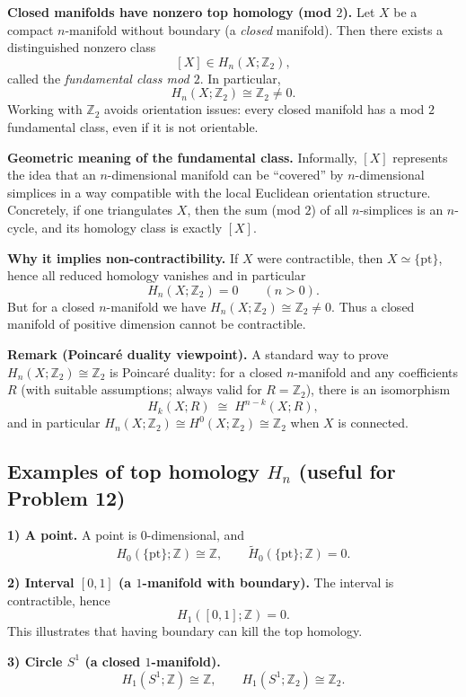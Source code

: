 \documentclass[12pt,a4paper]{article}
\theoremstyle{plain}
\theoremstyle{definition}      %
\begin{document}
\medskip
\noindent\textbf{Closed manifolds have nonzero top homology (mod $2$).}
Let $X$ be a compact $n$-manifold without boundary (a \emph{closed} manifold).
Then there exists a distinguished nonzero class
\[
[X]\in H_n(X;\mathbb{Z}_2),
\]
called the \emph{fundamental class mod $2$}. In particular,
\[
H_n(X;\mathbb{Z}_2)\cong \mathbb{Z}_2 \neq 0.
\]
Working with $\mathbb{Z}_2$ avoids orientation issues: every closed manifold has a mod $2$ fundamental class,
even if it is not orientable.

\medskip
\noindent\textbf{Geometric meaning of the fundamental class.}
Informally, $[X]$ represents the idea that an $n$-dimensional manifold can be ``covered'' by $n$-dimensional simplices
in a way compatible with the local Euclidean orientation structure.
Concretely, if one triangulates $X$, then the sum (mod $2$) of all $n$-simplices is an $n$-cycle,
and its homology class is exactly $[X]$.

\medskip
\noindent\textbf{Why it implies non-contractibility.}
If $X$ were contractible, then $X\simeq \{\mathrm{pt}\}$, hence all reduced homology vanishes and in particular
\[
H_n(X;\mathbb{Z}_2)=0 \qquad (n>0).
\]
But for a closed $n$-manifold we have $H_n(X;\mathbb{Z}_2)\cong\mathbb{Z}_2\neq 0$.
Thus a closed manifold of positive dimension cannot be contractible.

\medskip
\noindent\textbf{Remark (Poincar\'e duality viewpoint).}
A standard way to prove $H_n(X;\mathbb{Z}_2)\cong \mathbb{Z}_2$ is Poincar\'e duality:
for a closed $n$-manifold and any coefficients $R$ (with suitable assumptions; always valid for $R=\mathbb{Z}_2$),
there is an isomorphism
\[
H_k(X;R)\;\cong\; H^{n-k}(X;R),
\]
and in particular $H_n(X;\mathbb{Z}_2)\cong H^0(X;\mathbb{Z}_2)\cong \mathbb{Z}_2$
when $X$ is connected.

\subsection*{Examples of top homology $H_n$ (useful for Problem 12)}

\noindent\textbf{1) A point.}
A point is $0$-dimensional, and
\[
H_0(\{\mathrm{pt}\};\mathbb{Z})\cong \mathbb{Z},
\qquad
\widetilde H_0(\{\mathrm{pt}\};\mathbb{Z})=0.
\]

\medskip
\noindent\textbf{2) Interval $[0,1]$ (a $1$-manifold with boundary).}
The interval is contractible, hence
\[
H_1([0,1];\mathbb{Z})=0.
\]
This illustrates that having boundary can kill the top homology.

\medskip
\noindent\textbf{3) Circle $S^1$ (a closed $1$-manifold).}
\[
H_1(S^1;\mathbb{Z})\cong \mathbb{Z},
\qquad
H_1(S^1;\mathbb{Z}_2)\cong \mathbb{Z}_2.
\]
\end{document}
